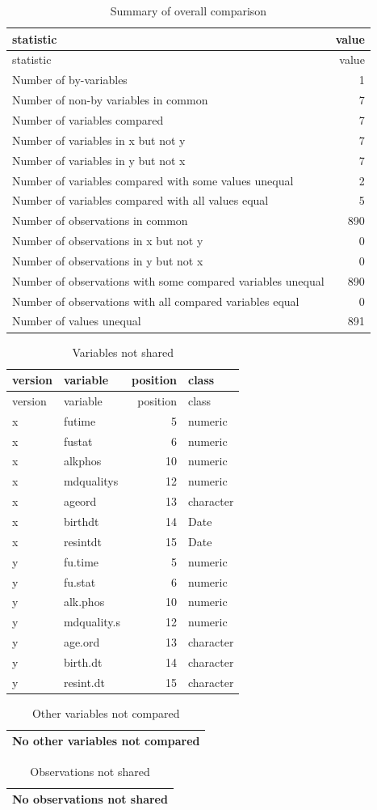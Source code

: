 \documentclass[
]{book}
\begin{document}
\begin{longtable}[]{@{}lr@{}}
\caption{\label{tab:unnamed-chunk-28}Summary of overall comparison}\tabularnewline
\toprule
statistic & value\tabularnewline
\midrule
\endfirsthead
\toprule
statistic & value\tabularnewline
\midrule
\endhead
Number of by-variables & 1\tabularnewline
Number of non-by variables in common & 7\tabularnewline
Number of variables compared & 7\tabularnewline
Number of variables in x but not y & 7\tabularnewline
Number of variables in y but not x & 7\tabularnewline
Number of variables compared with some values unequal & 2\tabularnewline
Number of variables compared with all values equal & 5\tabularnewline
Number of observations in common & 890\tabularnewline
Number of observations in x but not y & 0\tabularnewline
Number of observations in y but not x & 0\tabularnewline
Number of observations with some compared variables unequal & 890\tabularnewline
Number of observations with all compared variables equal & 0\tabularnewline
Number of values unequal & 891\tabularnewline
\bottomrule
\end{longtable}

\begin{longtable}[]{@{}llrl@{}}
\caption{\label{tab:unnamed-chunk-28}Variables not shared}\tabularnewline
\toprule
version & variable & position & class\tabularnewline
\midrule
\endfirsthead
\toprule
version & variable & position & class\tabularnewline
\midrule
\endhead
x & futime & 5 & numeric\tabularnewline
x & fustat & 6 & numeric\tabularnewline
x & alkphos & 10 & numeric\tabularnewline
x & mdqualitys & 12 & numeric\tabularnewline
x & ageord & 13 & character\tabularnewline
x & birthdt & 14 & Date\tabularnewline
x & resintdt & 15 & Date\tabularnewline
y & fu.time & 5 & numeric\tabularnewline
y & fu.stat & 6 & numeric\tabularnewline
y & alk.phos & 10 & numeric\tabularnewline
y & mdquality.s & 12 & numeric\tabularnewline
y & age.ord & 13 & character\tabularnewline
y & birth.dt & 14 & character\tabularnewline
y & resint.dt & 15 & character\tabularnewline
\bottomrule
\end{longtable}

\begin{longtable}[]{@{}l@{}}
\caption{\label{tab:unnamed-chunk-28}Other variables not compared}\tabularnewline
\toprule
\endhead
No other variables not compared\tabularnewline
\bottomrule
\end{longtable}

\begin{longtable}[]{@{}l@{}}
\caption{\label{tab:unnamed-chunk-28}Observations not shared}\tabularnewline
\toprule
\endhead
No observations not shared\tabularnewline
\bottomrule
\end{longtable}
\end{document}
